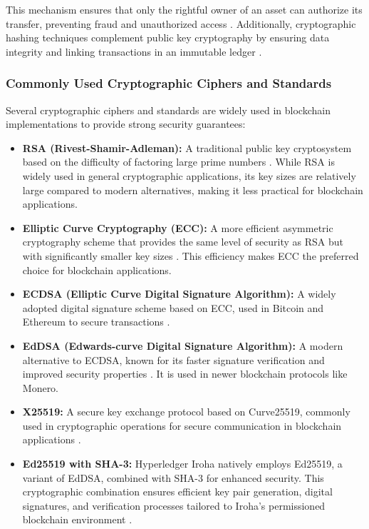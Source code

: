 \documentclass{article}
\begin{document}
This mechanism ensures that only the rightful owner of an asset can authorize its transfer, preventing fraud and unauthorized access \cite{wood2014ethereum}. Additionally, cryptographic hashing techniques complement public key cryptography by ensuring data integrity and linking transactions in an immutable ledger \cite{merkle1988digital}.

\subsubsection{Commonly Used Cryptographic Ciphers and Standards}
Several cryptographic ciphers and standards are widely used in blockchain implementations to provide strong security guarantees:

\begin{itemize}
    \item \textbf{RSA (Rivest-Shamir-Adleman):} A traditional public key cryptosystem based on the difficulty of factoring large prime numbers \cite{rivest1978method}. While RSA is widely used in general cryptographic applications, its key sizes are relatively large compared to modern alternatives, making it less practical for blockchain applications.
    \item \textbf{Elliptic Curve Cryptography (ECC):} A more efficient asymmetric cryptography scheme that provides the same level of security as RSA but with significantly smaller key sizes \cite{miller1986use}. This efficiency makes ECC the preferred choice for blockchain applications.
    \item \textbf{ECDSA (Elliptic Curve Digital Signature Algorithm):} A widely adopted digital signature scheme based on ECC, used in Bitcoin and Ethereum to secure transactions \cite{johnson2001elliptic}.
    \item \textbf{EdDSA (Edwards-curve Digital Signature Algorithm):} A modern alternative to ECDSA, known for its faster signature verification and improved security properties \cite{bernstein2012high}. It is used in newer blockchain protocols like Monero.
    \item \textbf{X25519:} A secure key exchange protocol based on Curve25519, commonly used in cryptographic operations for secure communication in blockchain applications \cite{langley2016curve25519}.
    \item \textbf{Ed25519 with SHA-3:} Hyperledger Iroha natively employs Ed25519, a variant of EdDSA, combined with SHA-3 for enhanced security. This cryptographic combination ensures efficient key pair generation, digital signatures, and verification processes tailored to Iroha’s permissioned blockchain environment \cite{hyperledger_iroha}.
\end{itemize}
\end{document}
